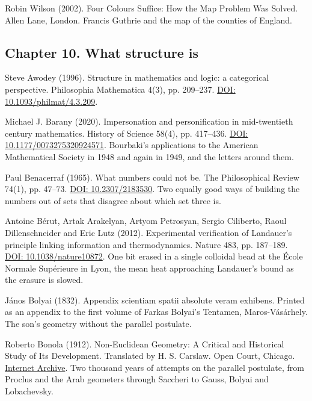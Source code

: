 \documentclass[11pt,twoside]{article}
\theoremstyle{thielethm}
\theoremstyle{thieledef}
\theoremstyle{thieledef}
\theoremstyle{thieledef}
\theoremstyle{thielethm}
\theoremstyle{thieleobs}
\theoremstyle{thielethm}
\begin{document}
\noindent Robin Wilson (2002). Four Colours Suffice: How the Map Problem Was Solved. Allen Lane, London. Francis Guthrie and the map of the counties of England.
\par\medskip

\subsection*{Chapter 10. What structure is}

\noindent Steve Awodey (1996). Structure in mathematics and logic: a categorical perspective. Philosophia Mathematica 4(3), pp. 209--237. \href{https://doi.org/10.1093/philmat/4.3.209}{DOI: 10.1093/philmat/4.3.209}.
\par\medskip

\noindent Michael J. Barany (2020). Impersonation and personification in mid-twentieth century mathematics. History of Science 58(4), pp. 417--436. \href{https://doi.org/10.1177/0073275320924571}{DOI: 10.1177/0073275320924571}. Bourbaki's applications to the American Mathematical Society in 1948 and again in 1949, and the letters around them.
\par\medskip

\noindent Paul Benacerraf (1965). What numbers could not be. The Philosophical Review 74(1), pp. 47--73. \href{https://doi.org/10.2307/2183530}{DOI: 10.2307/2183530}. Two equally good ways of building the numbers out of sets that disagree about which set three is.
\par\medskip

\noindent Antoine B\'erut, Artak Arakelyan, Artyom Petrosyan, Sergio Ciliberto, Raoul Dillenschneider and Eric Lutz (2012). Experimental verification of Landauer's principle linking information and thermodynamics. Nature 483, pp. 187--189. \href{https://doi.org/10.1038/nature10872}{DOI: 10.1038/nature10872}. One bit erased in a single colloidal bead at the \'Ecole Normale Sup\'erieure in Lyon, the mean heat approaching Landauer's bound as the erasure is slowed.
\par\medskip

\noindent J\'anos Bolyai (1832). Appendix scientiam spatii absolute veram exhibens. Printed as an appendix to the first volume of Farkas Bolyai's Tentamen, Maros-V\'as\'arhely. The son's geometry without the parallel postulate.
\par\medskip

\noindent Roberto Bonola (1912). Non-Euclidean Geometry: A Critical and Historical Study of Its Development. Translated by H. S. Carslaw. Open Court, Chicago. \href{https://archive.org/details/noneuclideangeom00bonouoft}{Internet Archive}. Two thousand years of attempts on the parallel postulate, from Proclus and the Arab geometers through Saccheri to Gauss, Bolyai and Lobachevsky.
\par\medskip
\end{document}
